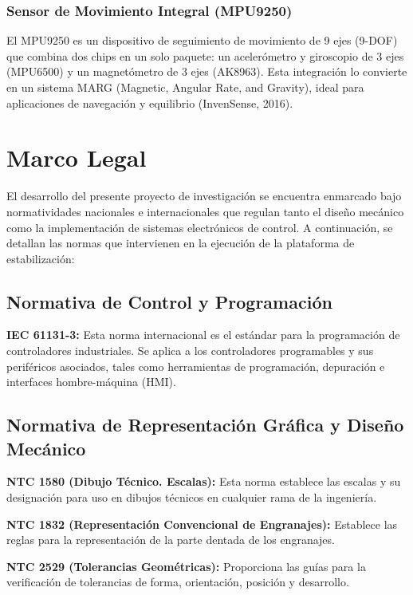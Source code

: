 \documentclass[12pt,letterpaper]{report}
\begin{document}
\subsubsection{Sensor de Movimiento Integral (MPU9250)}

El MPU9250 es un dispositivo de seguimiento de movimiento de 9 ejes (9-DOF) que combina dos chips en un solo paquete: un acelerómetro y giroscopio de 3 ejes (MPU6500) y un magnetómetro de 3 ejes (AK8963). Esta integración lo convierte en un sistema MARG (Magnetic, Angular Rate, and Gravity), ideal para aplicaciones de navegación y equilibrio (InvenSense, 2016).

\section{Marco Legal}

El desarrollo del presente proyecto de investigación se encuentra enmarcado bajo normatividades nacionales e internacionales que regulan tanto el diseño mecánico como la implementación de sistemas electrónicos de control. A continuación, se detallan las normas que intervienen en la ejecución de la plataforma de estabilización:

\subsection*{Normativa de Control y Programación}

\textbf{IEC 61131-3:} Esta norma internacional es el estándar para la programación de controladores industriales. Se aplica a los controladores programables y sus periféricos asociados, tales como herramientas de programación, depuración e interfaces hombre-máquina (HMI).

\subsection*{Normativa de Representación Gráfica y Diseño Mecánico}

\textbf{NTC 1580 (Dibujo Técnico. Escalas):} Esta norma establece las escalas y su designación para uso en dibujos técnicos en cualquier rama de la ingeniería.

\textbf{NTC 1832 (Representación Convencional de Engranajes):} Establece las reglas para la representación de la parte dentada de los engranajes.

\textbf{NTC 2529 (Tolerancias Geométricas):} Proporciona las guías para la verificación de tolerancias de forma, orientación, posición y desarrollo.
\end{document}
